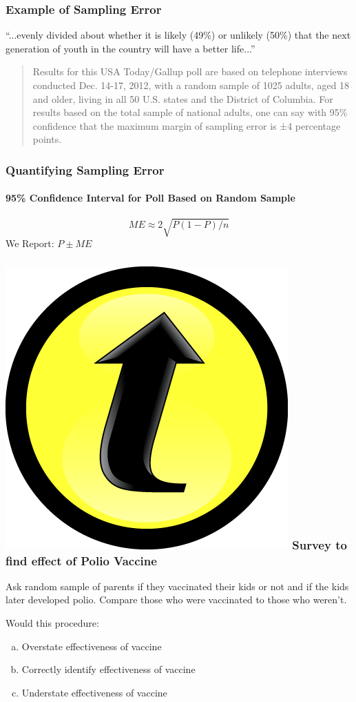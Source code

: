 \documentclass{beamer}
\begin{document}
\begin{frame}
\frametitle{Example of Sampling Error}
``...evenly divided about whether it is likely (49\%) or unlikely (50\%) that the next generation of youth in the country will have a better life...''

\vspace{2em}
\begin{quote}
Results for this USA Today/Gallup poll are based on telephone interviews conducted Dec. 14-17, 2012, with a \alert{random sample of 1025 adults}, aged 18 and older, living in all 50 U.S. states and the District of Columbia. For results based on the total sample of national adults, one can say with \alert{95\% confidence that the maximum margin of sampling error is ±4 percentage points}.
\end{quote}
\end{frame}
\begin{frame}
\frametitle{Quantifying Sampling Error}
\framesubtitle{95\% Confidence Interval for Poll Based on Random Sample}
	$$ME \approx 2 \sqrt{P(1-P)/n}$$
	We Report: $P \pm ME$
\end{frame}

\begin{frame}
\frametitle{\includegraphics[scale = 0.05]{./images/clicker} \hfill Survey to find effect of Polio Vaccine}
Ask random sample of parents if they vaccinated their kids or not and if the kids later developed polio. Compare those who were vaccinated to those who weren't.

\vspace{1em}


Would this procedure:
	\begin{enumerate}[(a)]
		\item Overstate effectiveness of vaccine
		\item Correctly identify effectiveness of vaccine
		\item Understate effectiveness of vaccine
	\end{enumerate}

\end{frame}
\end{document}
